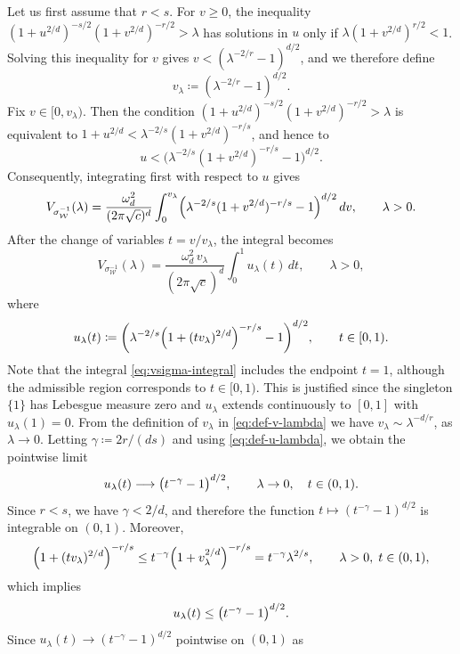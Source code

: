 \documentclass[a4paper,12pt]{article}
\let\originalleft\left
\let\originalright\right
\renewcommand{\left}{\mathopen{}\mathclose\bgroup\originalleft}
\renewcommand{\right}{\aftergroup\egroup\originalright}
\newcommand{\symbolnotsobw}{\symbolnot_{\mathcal{W}}}
\newcommand{\symbolnot}{\sigma}
\begin{document}
Let us first assume that $r<s$. For $v\ge0$, the inequality
$(1+u^{2/d})^{-s/2}(1+v^{2/d})^{-r/2}>\lambda$
has solutions in $u$ only if
$\lambda(1+v^{2/d})^{r/2} < 1 $. Solving this inequality for $v$
gives $v < (\lambda^{-2/r}-1)^{d/2}$, and we therefore define
\begin{equation}\label{eq:def-v-lambda}
    v_\lambda \coloneqq (\lambda^{-2/r}-1)^{d/2}.
\end{equation}
Fix $v\in[0,v_\lambda)$. Then the condition
$(1+u^{2/d})^{-s/2}(1+v^{2/d})^{-r/2}>\lambda$
is equivalent to
$1+u^{2/d}<\lambda^{-2/s}(1+v^{2/d})^{-r/s}$,
and hence to
\[
u < \bigl(\lambda^{-2/s}(1+v^{2/d})^{-r/s}-1\bigr)^{d/2}.
\]
Consequently, integrating first with respect to $u$ gives
\[
V_{\symbolnotsobw^{-1}}(\lambda)
=
\frac{\omega_d^2}{(2\pi\sqrt{c})^{d}}
\int_0^{v_\lambda}
\left(
\lambda^{-2/s}(1+v^{2/d})^{-r/s}-1
\right)^{d/2}
\,dv,
\qquad \lambda>0.
\]
After the change of variables $t = v/v_\lambda$, the integral becomes
\begin{equation}\label{eq:vsigma-integral}
V_{\symbolnotsobw^{-1}}(\lambda)
=
\frac{\omega_d^2\, v_\lambda}{(2\pi\sqrt{c})^{d}}
\int_0^{1} u_\lambda(t)\,dt,
\qquad \lambda>0,
\end{equation}
where
\begin{equation}\label{eq:def-u-lambda}
u_\lambda(t)
\coloneqq
\left(
\lambda^{-2/s}\left(1+(t v_\lambda)^{2/d}\right)^{-r/s}-1
\right)^{d/2},
    \qquad t\in[0,1).
\end{equation}
Note that the integral \eqref{eq:vsigma-integral} includes the endpoint $t=1$, although the admissible region corresponds to $t\in[0,1)$. This is justified since the singleton $\{1\}$ has Lebesgue measure zero and $u_\lambda$ extends continuously to $[0,1]$ with $u_\lambda(1)=0$.
From the definition of $v_\lambda$ in \eqref{eq:def-v-lambda} we have $v_\lambda \sim \lambda^{-d/r}$, as 
$\lambda \to 0$. Letting $\gamma \coloneqq 2r/(ds)$ and using \eqref{eq:def-u-lambda}, we obtain the
pointwise limit
\[
u_\lambda(t) \longrightarrow
\left(t^{-\gamma}-1\right)^{d/2},
\qquad \lambda\to0,
\quad t\in(0,1).
\]
Since $r<s$, we have $\gamma<2/d$, and therefore the function
$t\mapsto (t^{-\gamma}-1)^{d/2}$ is integrable on $(0,1)$.
Moreover,
\[
\left(1+(t v_\lambda)^{2/d}\right)^{-r/s}
\le
t^{-\gamma}\left(1+v_\lambda^{2/d}\right)^{-r/s}
=
t^{-\gamma}\lambda^{2/s},
\qquad \lambda>0,\; t\in(0,1),
\]
which implies
\[
u_\lambda(t)
\le
\left(t^{-\gamma}-1\right)^{d/2}.
\]
Since $u_\lambda(t)\to (t^{-\gamma}-1)^{d/2}$ pointwise on $(0,1)$ as
\end{document}
